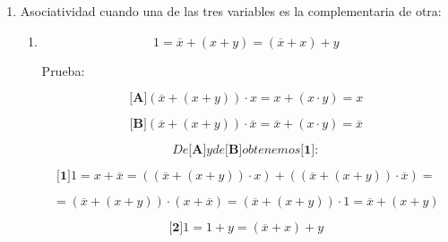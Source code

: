 \documentclass[
]{article}
\begin{document}
\begin{enumerate}
\begin{enumerate}
\begin{enumerate}
\begin{enumerate}
\begin{enumerate}
          \[{\lbrack\mathbf{2}\rbrack}{{{({x \cdot {({x \cdot y})}})} + x} = x}\]

          \[\mathit{De}{\lbrack\mathbf{1}\rbrack}y\mathit{de}{\lbrack\mathbf{2}\rbrack}\mathit{obtenemos}:\]

          \[{{x \cdot y} = {{\lbrack{{({x \cdot {({x \cdot y})}})} + x}\rbrack} \cdot {\lbrack{{({x \cdot {({x \cdot y})}})} + y}\rbrack}}} =\]

          \[{{= {{({x \cdot {({x \cdot y})}})} + {({x \cdot y})}}} = {{({x \cdot {({x \cdot y})}})} + {({{({x \cdot y})} \cdot {({x \cdot y})}})}}} =\]

          \[{= {{({{({x \cdot {({x \cdot y})}})} + {({x \cdot y})}})} \cdot {({{({x \cdot {({x \cdot y})}})} + {({x \cdot y})}})}}} =\]

          \[= {x \cdot {({x \cdot y})}}\]

          \[{{{({x \cdot x})} \cdot y} = {x \cdot y}} = {x \cdot {({x \cdot y})}}\]
        \end{enumerate}
      \item
        Asociatividad cuando una de las tres variables es la
        complementaria de otra:

        \begin{enumerate}
        \def\labelenumv{\arabic{enumv}.}
        \item
          \[{1 = {\overline{x} + {({x + y})}}} = {{({\overline{x} + x})} + y}\]

          Prueba:

          \[{\lbrack\mathbf{A}\rbrack}{{{{({\overline{x} + {({x + y})}})} \cdot x} = {x + {({x \cdot y})}}} = x}\]

          \[{\lbrack\mathbf{B}\rbrack}{{{{({\overline{x} + {({x + y})}})} \cdot \overline{x}} = {\overline{x} + {({x \cdot y})}}} = \overline{x}}\]

          \[\mathit{De}{\lbrack\mathbf{A}\rbrack}y\mathit{de}{\lbrack\mathbf{B}\rbrack}\mathit{obtenemos}{\lbrack\mathbf{1}\rbrack}:\]

          \[{\lbrack\mathbf{1}\rbrack}{{{1 = {x + \overline{x}}} = {{({{({\overline{x} + {({x + y})}})} \cdot x})} + {({{({\overline{x} + {({x + y})}})} \cdot \overline{x}})}}} =}\]

          \[{{= {{({\overline{x} + {({x + y})}})} \cdot {({x + \overline{x}})}}} = {{({\overline{x} + {({x + y})}})} \cdot 1}} = {\overline{x} + {({x + y})}}\]

          \[{\lbrack\mathbf{2}\rbrack}{{1 = {1 + y}} = {{({\overline{x} + x})} + y}}\]


\end{enumerate}
\end{enumerate}
\end{enumerate}
\end{enumerate}
\end{enumerate}
\end{document}
